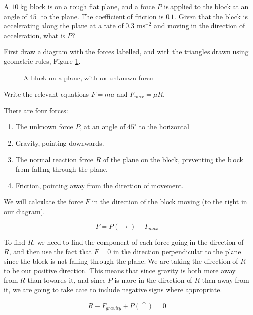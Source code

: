 \begin{example}
    A $10$ kg block is on a rough flat plane, and a force $P$ is applied to the block at an angle of $45^\circ$ to the plane. The coefficient of friction is $0.1$. 
    Given that the block is accelerating along the plane at a rate of $0.3\text{ ms}^{-2}$ and moving in the direction of acceleration, what is $P$?
\end{example}
\begin{solution}
    First draw a diagram with the forces labelled, and with the triangles drawn using geometric rules, Figure \ref{fig:block-on-plane-unknown-force}.

    \begin{figure}[H]
    \centering
    \caption{A block on a plane, with an unknown force}
    \label{fig:block-on-plane-unknown-force}
    \end{figure}

    Write the relevant equations $F=ma$ and $F_{max} = \mu R$.

    There are four forces:
    \begin{enumerate}
        \item The unknown force $P$, at an angle of $45^\circ$ to the horizontal.
        \item Gravity, pointing downwards.
        \item The normal reaction force $R$ of the plane on the block, preventing the block from falling through the plane.
        \item Friction, pointing away from the direction of movement.    
    \end{enumerate}

    We will calculate the force $F$ in the direction of the block moving (to the right in our diagram).

    \[F = P(\rightarrow) - F_{max}\]


    To find $R$, we need to find the component of each force going in the direction of $R$, and then use the fact that $F=0$ in the direction perpendicular to the plane since 
    the block is not falling through the plane. We are taking the direction of $R$ to be our positive direction. 
    This means that since gravity is both more away from $R$ than towards it, and since $P$ is more in the direction of $R$ than away from it, we are going to take care to include negative signs where appropriate.

    \[ R -F_{gravity} + P(\uparrow) = 0\]


\end{solution}
